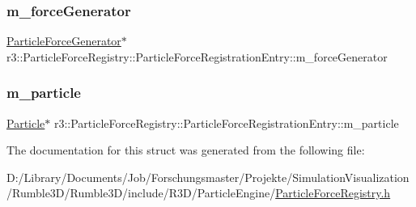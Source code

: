 \subsubsection{\texorpdfstring{m\+\_\+force\+Generator}{m\_forceGenerator}}
{\footnotesize\ttfamily \mbox{\hyperlink{classr3_1_1_particle_force_generator}{Particle\+Force\+Generator}}$\ast$ r3\+::\+Particle\+Force\+Registry\+::\+Particle\+Force\+Registration\+Entry\+::m\+\_\+force\+Generator}

\mbox{\label{structr3_1_1_particle_force_registry_1_1_particle_force_registration_entry_aeecc96403147078a56bc1d4f9425463d}} 
\subsubsection{\texorpdfstring{m\+\_\+particle}{m\_particle}}
{\footnotesize\ttfamily \mbox{\hyperlink{classr3_1_1_particle}{Particle}}$\ast$ r3\+::\+Particle\+Force\+Registry\+::\+Particle\+Force\+Registration\+Entry\+::m\+\_\+particle}



The documentation for this struct was generated from the following file\+:\begin{DoxyCompactItemize}
\item 
D\+:/\+Library/\+Documents/\+Job/\+Forschungsmaster/\+Projekte/\+Simulation\+Visualization/\+Rumble3\+D/\+Rumble3\+D/include/\+R3\+D/\+Particle\+Engine/\mbox{\hyperlink{_particle_force_registry_8h}{Particle\+Force\+Registry.\+h}}\end{DoxyCompactItemize}
